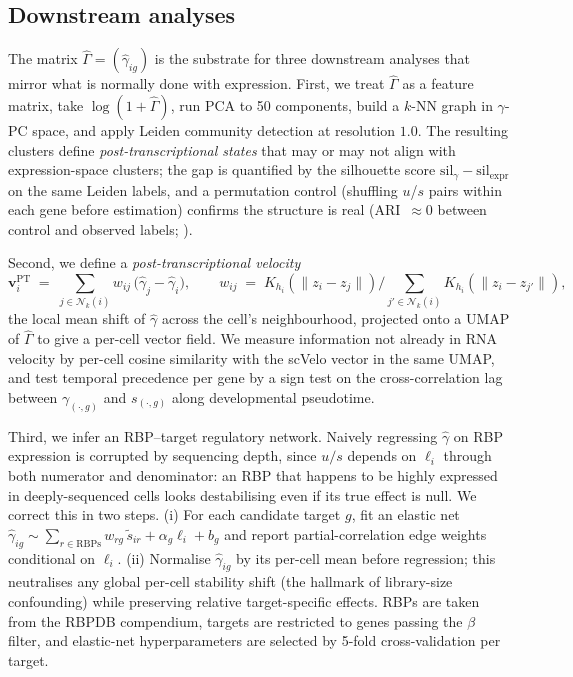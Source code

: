 \documentclass{article}
\begin{document}
\subsection{Downstream analyses}
\label{sec:method-downstream}

The matrix $\widehat\Gamma {=} (\widehat\gamma_{ig})$ is the substrate for
three downstream analyses that mirror what is normally done with
expression. First, we treat $\widehat\Gamma$ as a feature matrix, take
$\log(1{+}\widehat\Gamma)$, run PCA to 50 components, build a $k$-NN graph
in $\gamma$-PC space, and apply Leiden community detection at resolution
$1.0$. The resulting clusters define \emph{post-transcriptional states}
that may or may not align with expression-space clusters; the gap is
quantified by the silhouette score
$\mathrm{sil}_\gamma{-}\mathrm{sil}_{\mathrm{expr}}$ on the same Leiden
labels, and a permutation control (shuffling $u$/$s$ pairs within each
gene before estimation) confirms the structure is real
(ARI~$\approx 0$ between control and observed labels;
).

Second, we define a \emph{post-transcriptional velocity}
\begin{equation}
  \mathbf v^{\mathrm{PT}}_i \;=\;
   \sum_{j\in\mathcal N_k(i)} w_{ij}\, \bigl(\widehat\gamma_{j} - \widehat\gamma_{i}\bigr),
   \qquad w_{ij} \;=\; K_{h_i}(\|z_i{-}z_j\|)\Big/\!\!\sum_{j'\in\mathcal N_k(i)}\!\!K_{h_i}(\|z_i{-}z_{j'}\|),
\end{equation}
the local mean shift of $\widehat\gamma$ across the cell's neighbourhood,
projected onto a UMAP of $\widehat\Gamma$ to give a per-cell vector field.
We measure information not already in RNA velocity by per-cell cosine
similarity with the scVelo vector in the same UMAP, and test temporal
precedence per gene by a sign test on the cross-correlation lag between
$\gamma_{(\cdot,g)}$ and $s_{(\cdot,g)}$ along developmental pseudotime.

Third, we infer an RBP--target regulatory network. Naively regressing
$\widehat\gamma$ on RBP expression is corrupted by sequencing depth, since
$u/s$ depends on $\ell_i$ through both numerator and denominator: an RBP
that happens to be highly expressed in deeply-sequenced cells looks
destabilising even if its true effect is null. We correct this in two
steps. (i) For each candidate target $g$, fit an elastic net
\(\widehat\gamma_{ig} \sim \sum_{r\in\mathrm{RBPs}} w_{rg}\, \widetilde s_{ir}
+ \alpha_g \ell_i + b_g\)
and report partial-correlation edge weights conditional on $\ell_i$.
(ii) Normalise $\widehat\gamma_{ig}$ by its per-cell mean before
regression; this neutralises any global per-cell stability shift (the
hallmark of library-size confounding) while preserving relative
target-specific effects. RBPs are taken from the RBPDB compendium, targets
are restricted to genes passing the $\beta$ filter, and elastic-net
hyperparameters are selected by 5-fold cross-validation per target.
\end{document}
